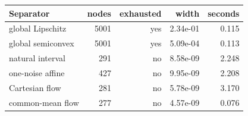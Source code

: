 \begin{tabular}{lrrrr}
\toprule
Separator & nodes & exhausted & width & seconds \\
\midrule
global Lipschitz & 5001 & yes & 2.34e-01 & 0.115 \\
global semiconvex & 5001 & yes & 5.09e-04 & 0.113 \\
natural interval & 291 & no & 8.58e-09 & 2.248 \\
one-noise affine & 427 & no & 9.95e-09 & 2.208 \\
Cartesian flow & 281 & no & 5.78e-09 & 3.170 \\
common-mean flow & 277 & no & 4.57e-09 & 0.076 \\
\bottomrule
\end{tabular}
